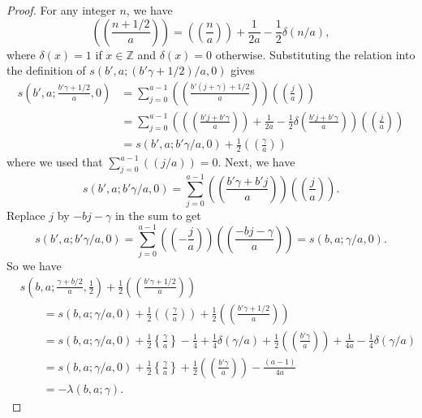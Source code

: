 \documentclass{amsart}
\theoremstyle{definition}
\theoremstyle{remark}
\numberwithin{equation}{section}
\begin{document}
\begin{proof}
For any integer $n$, we have
\[
\left( \! \left( \frac{n + 1/2}{a} \right) \! \right) = \left( \! \left( \frac{n}{a} \right) \! \right) + \frac{1}{2a} - \frac{1}{2} \delta(n/a),
\]
where $\delta(x) = 1$ if $x \in \mathbb{Z}$ and $\delta(x) = 0$ otherwise. Substituting the relation into the definition of $s(b',a ; (b'\gamma + 1/2)/a , 0)$ gives
\begin{align*}
s\left(b' , a ; \frac{b'\gamma + 1/2}{a} , 0 \right) &= \sum_{j=0}^{a-1} \left( \! \left( \frac{ b'(j+\gamma) + 1/2 }{a} \right) \! \right) \left( \! \left( \frac{j}{a} \right) \! \right) \\
&= \sum_{j=0}^{a-1} \left( \left( \! \left( \frac{b'j + b'\gamma}{a} \right) \! \right) + \frac{1}{2a} - \frac{1}{2} \delta\left( \frac{b'j + b'\gamma}{a} \right) \right) \left( \! \left( \frac{j}{a} \right) \! \right) \\
&= s(b',a ; b'\gamma/a , 0) + \frac{1}{2} \left( \! \left( \frac{ \gamma }{a} \right) \! \right)
\end{align*}
where we used that $\sum_{j=0}^{a-1} (( j/a )) = 0$. Next, we have 
\[
s(b',a ; b'\gamma/a , 0 ) = \sum_{j=0}^{a-1} \left( \! \left( \frac{ b'\gamma + b'j}{a} \right) \! \right) \left( \! \left( \frac{j}{a} \right) \! \right).
\]
Replace $j$ by $-bj-\gamma$ in the sum to get
\[
s(b',a ; b'\gamma/a , 0) = \sum_{j=0}^{a-1} \left( \! \left( -\frac{j}{a} \right) \! \right) \left( \! \left( \frac{-bj - \gamma}{a} \right) \! \right) = s(b,a ; \gamma/a , 0).
\]
So we have
\begin{align*}
& s\left(b,a ; \frac{ \gamma + b/2 }{a} , \frac{1}{2} \right) + \frac{1}{2}\left( \! \left( \frac{b'\gamma + 1/2}{a} \right) \! \right) \\
& \quad \quad = s(b,a ; \gamma/a , 0) + \frac{1}{2} \left( \! \left( \frac{\gamma}{a} \right) \! \right) + \frac{1}{2}\left( \! \left( \frac{b'\gamma + 1/2}{a} \right) \! \right) \\
& \quad \quad = s(b,a ; \gamma/a , 0) + \frac{1}{2} \left\{ \frac{\gamma}{a} \right\} - \frac{1}{4} + \frac{1}{4}\delta(\gamma/a) + \frac{1}{2}\left( \! \left( \frac{b'\gamma }{a} \right) \! \right) + \frac{1}{4a} - \frac{1}{4}\delta(\gamma/a) \\
& \quad \quad = s(b,a ; \gamma/a , 0) + \frac{1}{2} \left\{ \frac{\gamma}{a} \right\} + \frac{1}{2}\left( \! \left( \frac{b'\gamma }{a} \right) \! \right) - \frac{(a-1)}{4a} \\
& \quad \quad = -\lambda(b,a;\gamma).
\end{align*}

\end{proof}
\end{document}
